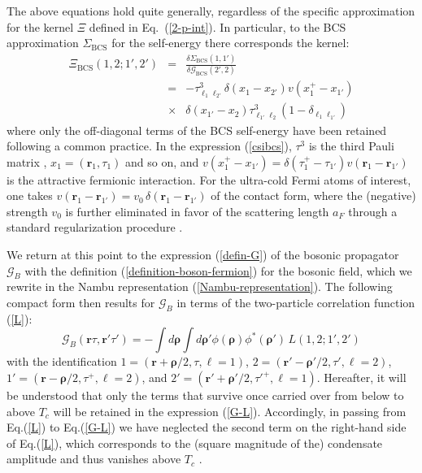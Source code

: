 \documentclass[pra,twocolumn,aps,amssymb,showpacs,superscriptaddress]{revtex4-1}
\begin{document}
The above equations hold quite generally, regardless of the specific approximation for the kernel $\Xi$ defined in Eq.~(\ref{2-p-int}).
In particular, to the BCS approximation $\Sigma_{\mathrm{BCS}}$ for the self-energy there corresponds the kernel:
\begin{eqnarray}
\Xi_{\mathrm{BCS}}(1,2;1',2') & = & \frac{\delta \Sigma_{\mathrm{BCS}}(1,1')}{\delta {\mathcal G}_{\mathrm{BCS}}(2',2)}
\label{csibcs} \\
& = & -  \tau^{3}_{\ell_{1}\ell_{2'}} \delta(x_{1}-x_{2'}) v(x_{1}^{+}-x_{1'})
\nonumber \\
& \times & \delta(x_{1'}-x_{2})  \tau^{3}_{\ell_{1'}\ell_{2}}  (1  - \delta_{\ell_{1}\ell_{1'}})
\nonumber
\end{eqnarray}
where only the off-diagonal terms of the BCS self-energy have been retained following a common practice.
In the expression (\ref{csibcs}), $\tau^{3}$ is the third Pauli matrix \cite{Schrieffer-1964}, $x_{1}=({\mathbf r}_{1}, \tau_{1})$ and so on, and $v(x_{1}^{+}-x_{1'}) = \delta(\tau_{1}^{+}-\tau_{1'}) v({\mathbf r_{1}}-{\mathbf r_{1'}})$ is the attractive fermionic interaction.
For the ultra-cold Fermi atoms of interest, one takes $v({\mathbf r_{1}}-{\mathbf r_{1'}}) = v_{0} \, \delta({\mathbf r_{1}}-{\mathbf r_{1'}})$ of the contact form, where the (negative) strength $v_{0} $ is further eliminated in favor of the scattering length $a_{F}$ through a standard regularization procedure \cite{Physics-Reports-2018}.

We return at this point to the expression (\ref{defin-G}) of the bosonic propagator $\mathcal{G}_{B}$ with the definition (\ref{definition-boson-fermion}) for the bosonic field, which we rewrite in the Nambu representation (\ref{Nambu-representation}).
The following compact form then results for $\mathcal{G}_{B}$ in terms of the two-particle correlation function (\ref{L}):
\begin{equation}
\mathcal{G}_{B}({\mathbf r} \tau,{\mathbf r}' \tau')  =  -  \int \!\! d\boldsymbol{\rho} \!\! \int \!\! d\boldsymbol{\rho}'  \phi(\boldsymbol{\rho}) \phi^{*}(\boldsymbol{\rho}') \, L(1,2;1',2')            
\label{G-L}
\end{equation}
with the identification $1=({\mathbf r}+\boldsymbol{\rho}/2,\tau,\ell=1)$, $2=({\mathbf r}'-\boldsymbol{\rho}'/2,\tau',\ell=2)$, $1'=({\mathbf r}-\boldsymbol{\rho}/2,\tau^{+},\ell=2)$,
and $2'=({\mathbf r}'+\boldsymbol{\rho}'/2,\tau'^{+},\ell=1)$.
Hereafter, it will be understood that only the terms that survive once carried over from below to above $T_{c}$ will be retained in the expression (\ref{G-L}).
Accordingly, in passing from Eq.(\ref{L}) to Eq.(\ref{G-L}) we have neglected the second term on the right-hand side of Eq.(\ref{L}), which corresponds to the (square magnitude of the) condensate amplitude
and thus vanishes above $T_{c}$ \cite{Andrenacci-2003}.
\end{document}

